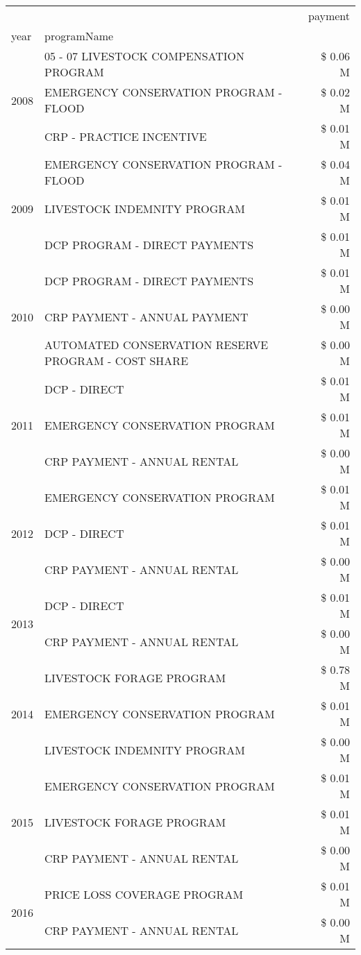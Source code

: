 \begin{tabular}{llr}
\toprule
 &  & payment \\
year & programName &  \\
\midrule
\multirow[t]{3}{*}{2008} & 05 - 07 LIVESTOCK COMPENSATION PROGRAM & \$ 0.06 M \\
 & EMERGENCY CONSERVATION PROGRAM - FLOOD & \$ 0.02 M \\
 & CRP - PRACTICE INCENTIVE & \$ 0.01 M \\
\cline{1-3}
\multirow[t]{3}{*}{2009} & EMERGENCY CONSERVATION PROGRAM - FLOOD & \$ 0.04 M \\
 & LIVESTOCK INDEMNITY PROGRAM & \$ 0.01 M \\
 & DCP PROGRAM - DIRECT PAYMENTS & \$ 0.01 M \\
\cline{1-3}
\multirow[t]{3}{*}{2010} & DCP PROGRAM - DIRECT PAYMENTS & \$ 0.01 M \\
 & CRP PAYMENT - ANNUAL PAYMENT & \$ 0.00 M \\
 & AUTOMATED CONSERVATION RESERVE PROGRAM - COST SHARE & \$ 0.00 M \\
\cline{1-3}
\multirow[t]{3}{*}{2011} & DCP - DIRECT & \$ 0.01 M \\
 & EMERGENCY CONSERVATION PROGRAM & \$ 0.01 M \\
 & CRP PAYMENT - ANNUAL RENTAL & \$ 0.00 M \\
\cline{1-3}
\multirow[t]{3}{*}{2012} & EMERGENCY CONSERVATION PROGRAM & \$ 0.01 M \\
 & DCP - DIRECT & \$ 0.01 M \\
 & CRP PAYMENT - ANNUAL RENTAL & \$ 0.00 M \\
\cline{1-3}
\multirow[t]{2}{*}{2013} & DCP - DIRECT & \$ 0.01 M \\
 & CRP PAYMENT - ANNUAL RENTAL & \$ 0.00 M \\
\cline{1-3}
\multirow[t]{3}{*}{2014} & LIVESTOCK FORAGE PROGRAM & \$ 0.78 M \\
 & EMERGENCY CONSERVATION PROGRAM & \$ 0.01 M \\
 & LIVESTOCK INDEMNITY PROGRAM & \$ 0.00 M \\
\cline{1-3}
\multirow[t]{3}{*}{2015} & EMERGENCY CONSERVATION PROGRAM & \$ 0.01 M \\
 & LIVESTOCK FORAGE PROGRAM & \$ 0.01 M \\
 & CRP PAYMENT - ANNUAL RENTAL & \$ 0.00 M \\
\cline{1-3}
\multirow[t]{2}{*}{2016} & PRICE LOSS COVERAGE PROGRAM & \$ 0.01 M \\
 & CRP PAYMENT - ANNUAL RENTAL & \$ 0.00 M \\

\end{tabular}
